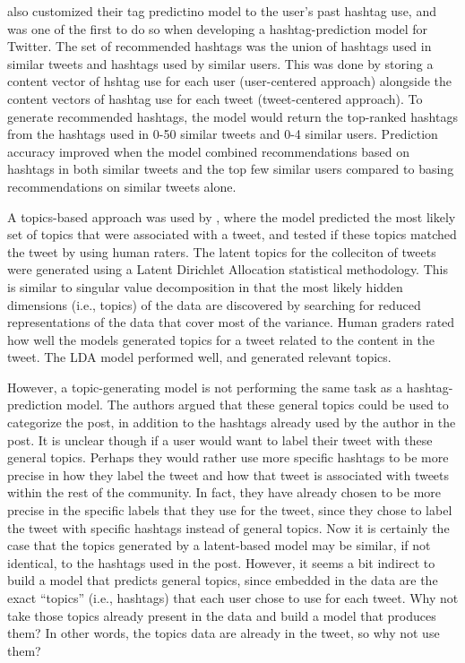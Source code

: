 \documentclass[man,floatsintext]{apa6}
\begin{document}
\textcite{Kywe2012} also customized their tag predictino model to the user's past hashtag use, and was one of the first to do so when developing a hashtag-prediction model for Twitter.
The set of recommended hashtags was the union of hashtags used in similar tweets and hashtags used by similar users.
This was done by storing a content vector of hshtag use for each user (user-centered approach) alongside the content vectors of hashtag use for each tweet (tweet-centered approach).
To generate recommended hashtags, the model would return the top-ranked hashtags from the hashtags used in 0-50 similar tweets and 0-4 similar users.
Prediction accuracy improved when the model combined recommendations based on hashtags in both similar tweets and the top few similar users compared to basing recommendations on similar tweets alone. 

A topics-based approach was used by \textcite{Godin2013}, where the model predicted the most likely set of topics that were associated with a tweet, and tested if these topics matched the tweet by using human raters.
The latent topics for the colleciton of tweets were generated using a Latent Dirichlet Allocation statistical methodology.
This is similar to singular value decomposition in that the most likely hidden dimensions (i.e., topics) of the data are discovered by searching for reduced representations of the data that cover most of the variance. 
Human graders rated how well the models generated topics for a tweet related to the content in the tweet.
The LDA model performed well, and generated relevant topics.

However, a topic-generating model is not performing the same task as a hashtag-prediction model.
The authors argued that these general topics could be used to categorize the post, in addition to the hashtags already used by the author in the post.
It is unclear though if a user would want to label their tweet with these general topics.
Perhaps they would rather use more specific hashtags to be more precise in how they label the tweet and how that tweet is associated with tweets within the rest of the community.
In fact, they have already chosen to be more precise in the specific labels that they use for the tweet, since they chose to label the tweet with specific hashtags instead of general topics.
Now it is certainly the case that the topics generated by a latent-based model may be similar, if not identical, to the hashtags used in the post.
However, it seems a bit indirect to build a model that predicts general topics, since embedded in the data are the exact ``topics'' (i.e., hashtags) that each user chose to use for each tweet.
Why not take those topics already present in the data and build a model that produces them?
In other words, the topics data are already in the tweet, so why not use them?
\end{document}
